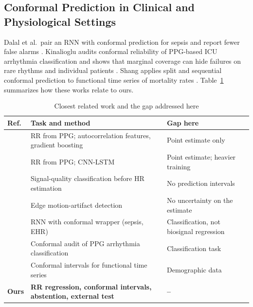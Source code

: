 \documentclass[conference]{IEEEtran}
\begin{document}
\subsection{Conformal Prediction in Clinical and Physiological Settings}
Dalal et al.\ pair an RNN with conformal prediction for sepsis and report fewer false alarms \cite{dalal2025sepsis}. Kinalioglu audits conformal reliability of PPG-based ICU arrhythmia classification and shows that marginal coverage can hide failures on rare rhythms and individual patients \cite{kinalioglu2026conformal}. Shang applies split and sequential conformal prediction to functional time series of mortality rates \cite{shang2026conformal}. Table~\ref{tab:related} summarizes how these works relate to ours.

\begin{table}[!t]
\caption{Closest related work and the gap addressed here}
\label{tab:related}
\centering\footnotesize
\renewcommand{\arraystretch}{1.1}
\begin{tabular}{@{}p{0.85cm}p{3.55cm}p{3.1cm}@{}}
\toprule
\textbf{Ref.} & \textbf{Task and method} & \textbf{Gap here} \\
\midrule
\cite{lee2022rr} & RR from PPG; autocorrelation features, gradient boosting & Point estimate only \\
\cite{chin2024rr} & RR from PPG; CNN-LSTM & Point estimate; heavier training \\
\cite{zhao2026sqi} & Signal-quality classification before HR estimation & No prediction intervals \\
\cite{zheng2024tinyppg} & Edge motion-artifact detection & No uncertainty on the estimate \\
\cite{dalal2025sepsis} & RNN with conformal wrapper (sepsis, EHR) & Classification, not biosignal regression \\
\cite{kinalioglu2026conformal} & Conformal audit of PPG arrhythmia classification & Classification task \\
\cite{shang2026conformal} & Conformal intervals for functional time series & Demographic data \\
\textbf{Ours} & \textbf{RR regression, conformal intervals, abstention, external test} & \textbf{--} \\
\bottomrule
\end{tabular}
\end{table}

\end{document}
